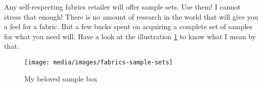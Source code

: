 Any self-respecting fabrics retailer will offer sample sets. Use them! I cannot stress that enough! There is no amount of research in the world that will give you a feel for a fabric. But a few bucks spent on acquiring a complete set of samples for what you need will. Have a look at the illustration \ref{img:fabrics-sample-sets} to know what I mean by that.

\begin{figure}[H]
  \texttt{[image: media/images/fabrics-sample-sets]}
  \caption{My beloved sample box}
  \label{img:fabrics-sample-sets}
\end{figure}

